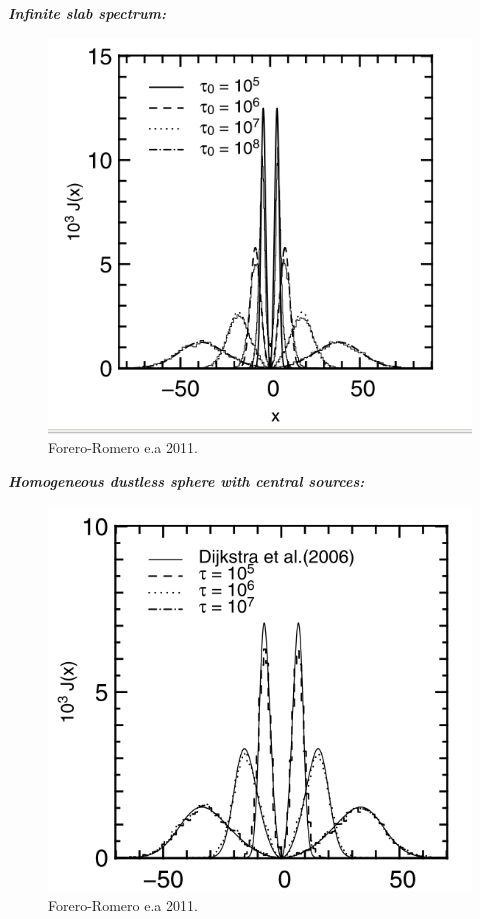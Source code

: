 \documentclass{beamer}
\begin{document}
\begin{frame}{\textit{\textbf{Infinite slab spectrum:}}}
\begin{figure}
\includegraphics[scale=0.4]{Figures/slab.png}
\caption*{Forero-Romero e.a 2011.}
\end{figure}
\end{frame}


\begin{frame}{\textit{\textbf{Homogeneous dustless sphere with central sources:}}}
\begin{figure}
\includegraphics[scale=0.35]{Figures/sphere.png}
\caption*{Forero-Romero e.a 2011.}
\end{figure}
\end{frame}
\end{document}
